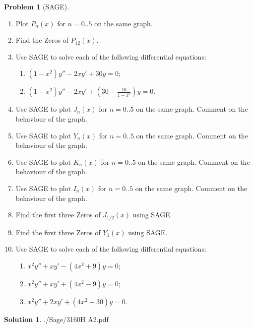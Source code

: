\documentclass[10pt]{article}
\theoremstyle{definition}
\newtheorem{problem}{Problem}
\newtheorem{soln}{Solution}
\begin{document}
\begin{problem}[SAGE]
\begin{enumerate}[label=(\alph*)]
  \item Plot $P_n(x)$ for $n = 0..5$ on the same graph.
  \item Find the Zeros of $P_{12}(x)$.
  \item Use SAGE to solve each of the following differential equations:
        \begin{enumerate}[label=(\roman*)]
          \item $\displaystyle (1-x^2)y''-2xy'+30y=0$;
          \item $\displaystyle (1-x^2)y''-2xy'+\left(30-\frac{16}{1-x^2}\right)y=0$.
        \end{enumerate}
  \item Use SAGE to plot $J_n(x)$ for $n = 0..5$ on the same graph. Comment on the behaviour of the
        graph.
  \item Use SAGE to plot $Y_n(x)$ for $n = 0..5$ on the same graph. Comment on the behaviour of the
        graph.
  \item Use SAGE to plot $K_n(x)$ for $n = 0..5$ on the same graph. Comment on the behaviour of the
        graph.
  \item Use SAGE to plot $I_n(x)$ for $n = 0..5$ on the same graph. Comment on the behaviour of the
        graph.
  \item Find the first three Zeros of $J_{1/2}(x)$ using SAGE.
  \item Find the first three Zeros of $Y_1(x)$ using SAGE.
  \item Use SAGE to solve each of the following differential equations:
        \begin{enumerate}[label=(\roman*)]
          \item $\displaystyle x^2y'' + xy' - (4x^2 + 9)y = 0$;
          \item $\displaystyle x^2y'' + xy' + (4x^2 - 9)y = 0$;
          \item $\displaystyle x^2y'' + 2xy' + (4x^2 -30)y = 0$.
        \end{enumerate}
\end{enumerate}
\end{problem}
\begin{soln}
  
  {./Sage/3160H A2.pdf}
\end{soln}
\end{document}
